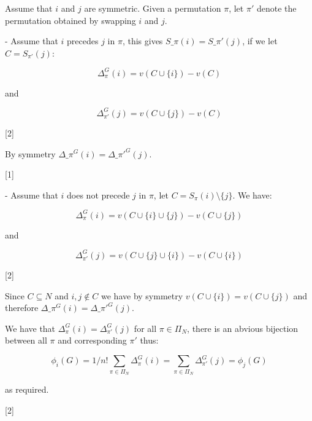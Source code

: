 \documentclass[12pt,a4paper]{article}
\makeatletter
\renewcommand{\@oddfoot}{\hfil \arabic{page} \hfil}    %
\makeatother
\begin{document}
\begin{enumerate}
\begin{enumerate}
        Assume that \(i\) and \(j\) are symmetric. Given a permutation \(\pi\), let \(\pi'\) denote the permutation obtained by swapping \(i\) and \(j\).

        - Assume that \(i\) precedes \(j\) in \(\pi\), this gives \(S\_{\pi}(i)=S\_{\pi'}(j)\), if we let \(C=S_{\pi'}(j)\):

            $$\Delta_{\pi}^{G}(i)=v(C\cup \{i\})-v(C)$$

            and

            $$\Delta_{\pi'}^{G}(j)=v(C\cup \{j\})-v(C)$$

        \hfill{[2]}

            By symmetry \(\Delta\_{\pi}^{G}(i)=\Delta\_{\pi'}^{G}(j)\).

        \hfill{[1]}

        - Assume that \(i\) does not precede \(j\) in \(\pi\), let \(C=S_{\pi}(i)\setminus \{j\}\). We have:

            $$\Delta_{\pi}^{G}(i)=v(C\cup \{i\} \cup \{j\})-v(C\cup \{j\})$$

            and

            $$\Delta_{\pi'}^{G}(j)=v(C\cup \{j\} \cup \{i\})-v(C\cup \{i\})$$

        \hfill{[2]}

            Since \(C\subseteq N\) and \(i,j\notin C\) we have by symmetry \(v(C\cup\{i\})=v(C\cup\{j\})\) and therefore \(\Delta\_{\pi}^{G}(i)=\Delta\_{\pi'}^{G}(j)\).

        We have that \(\Delta_{\pi}^{G}(i)=\Delta_{\pi'}^{G}(j)\) for all \(\pi\in\Pi_N\), there is an abvious bijection between all \(\pi\) and corresponding \(\pi'\) thus:

        $$\phi_i(G)=1/n!\sum_{\pi\in\Pi_N}\Delta_{\pi}^{G}(i)=\sum_{\pi\in\Pi_N}\Delta_{\pi'}^{G}(j)=\phi_j(G)$$

        as required.

        \hfill{[2]}


    \end{enumerate}
\end{enumerate}


\makeatletter
\renewcommand{\@oddfoot}{\hfil \arabic{page}X \hfil}    %
\makeatother
\end{document}
